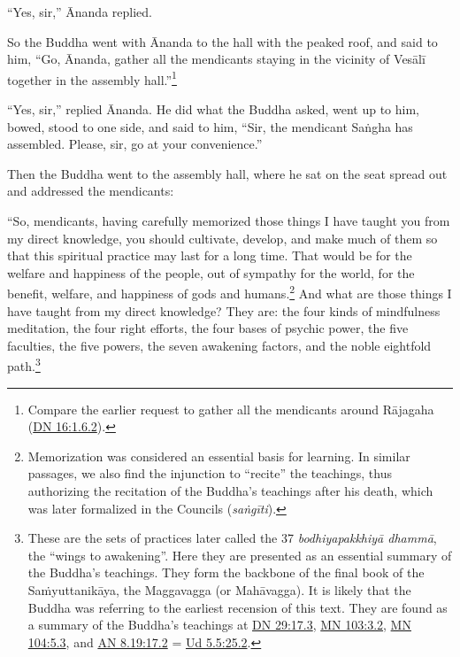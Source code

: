 \documentclass[12pt,openany]{book}%
\begin{document}
“Yes, sir,” Ānanda replied. 

So the Buddha went with Ānanda to the hall with the peaked roof, and said to him, “Go, Ānanda, gather all the mendicants staying in the vicinity of \textsanskrit{Vesālī} together in the assembly hall.”\footnote{Compare the earlier request to gather all the mendicants around \textsanskrit{Rājagaha} (\href{https://suttacentral.net/dn16/en/sujato\#1.6.2}{DN 16:1.6.2}). } 

“Yes, sir,” replied Ānanda. He did what the Buddha asked, went up to him, bowed, stood to one side, and said to him, “Sir, the mendicant \textsanskrit{Saṅgha} has assembled. Please, sir, go at your convenience.” 

Then the Buddha went to the assembly hall, where he sat on the seat spread out and addressed the mendicants: 

“So, mendicants, having carefully memorized those things I have taught you from my direct knowledge, you should cultivate, develop, and make much of them so that this spiritual practice may last for a long time. That would be for the welfare and happiness of the people, out of sympathy for the world, for the benefit, welfare, and happiness of gods and humans.\footnote{Memorization was considered an essential basis for learning. In similar passages, we also find the injunction to “recite” the teachings, thus authorizing the recitation of the Buddha’s teachings after his death, which was later formalized in the Councils (\textit{\textsanskrit{saṅgīti}}). } And what are those things I have taught from my direct knowledge? They are: the four kinds of mindfulness meditation, the four right efforts, the four bases of psychic power, the five faculties, the five powers, the seven awakening factors, and the noble eightfold path.\footnote{These are the sets of practices later called the 37 \textit{\textsanskrit{bodhiyapakkhiyā} \textsanskrit{dhammā}}, the “wings to awakening”. Here they are presented as an essential summary of the Buddha’s teachings. They form the backbone of the final book of the \textsanskrit{Saṁyuttanikāya}, the Maggavagga (or \textsanskrit{Mahāvagga}). It is likely that the Buddha was referring to the earliest recension of this text. They are found as a summary of the Buddha’s teachings at \href{https://suttacentral.net/dn29/en/sujato\#17.3}{DN 29:17.3}, \href{https://suttacentral.net/mn103/en/sujato\#3.2}{MN 103:3.2}, \href{https://suttacentral.net/mn104/en/sujato\#5.3}{MN 104:5.3}, and \href{https://suttacentral.net/an8.19/en/sujato\#17.2}{AN 8.19:17.2} = \href{https://suttacentral.net/ud5.5/en/sujato\#25.2}{Ud 5.5:25.2}. } 
\end{document}

